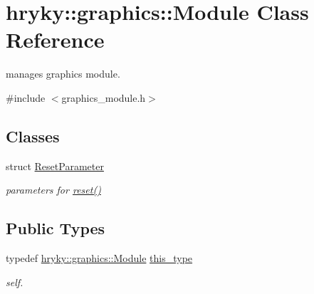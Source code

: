 \hypertarget{classhryky_1_1graphics_1_1_module}{\section{hryky\-:\-:graphics\-:\-:Module Class Reference}
\label{classhryky_1_1graphics_1_1_module}
}


manages graphics module.  




{\ttfamily \#include $<$graphics\-\_\-module.\-h$>$}

\subsection*{Classes}
\begin{DoxyCompactItemize}
\item 
struct \hyperlink{structhryky_1_1graphics_1_1_module_1_1_reset_parameter}{Reset\-Parameter}
\begin{DoxyCompactList}\small\item\em parameters for \hyperlink{classhryky_1_1graphics_1_1_module_a5c8abe754f63338ef1f62392e93e3306}{reset()} \end{DoxyCompactList}\end{DoxyCompactItemize}
\subsection*{Public Types}
\begin{DoxyCompactItemize}
\item 
\hypertarget{classhryky_1_1graphics_1_1_module_a7145b30601df820c888b3e8d90326568}{typedef \hyperlink{classhryky_1_1graphics_1_1_module}{hryky\-::graphics\-::\-Module} \hyperlink{classhryky_1_1graphics_1_1_module_a7145b30601df820c888b3e8d90326568}{this\-\_\-type}}\label{classhryky_1_1graphics_1_1_module_a7145b30601df820c888b3e8d90326568}

\begin{DoxyCompactList}\small\item\em self. \end{DoxyCompactList}\end{DoxyCompactItemize}
